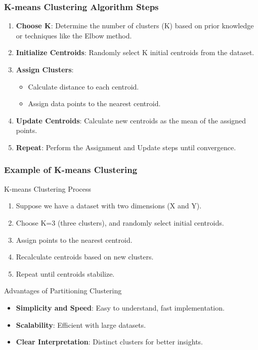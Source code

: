 \documentclass{beamer}
\begin{document}
\begin{frame}[fragile]
    \frametitle{K-means Clustering Algorithm Steps}
    \begin{enumerate}
        \item \textbf{Choose K}: Determine the number of clusters (K) based on prior knowledge or techniques like the Elbow method.
        \item \textbf{Initialize Centroids}: Randomly select K initial centroids from the dataset.
        \item \textbf{Assign Clusters}:
            \begin{itemize}
                \item Calculate distance to each centroid.
                \item Assign data points to the nearest centroid.
            \end{itemize}
        \item \textbf{Update Centroids}: Calculate new centroids as the mean of the assigned points.
        \item \textbf{Repeat}: Perform the Assignment and Update steps until convergence.
    \end{enumerate}
\end{frame}

\begin{frame}[fragile]
    \frametitle{Example of K-means Clustering}
    \begin{block}{K-means Clustering Process}
        \begin{enumerate}
            \item Suppose we have a dataset with two dimensions (X and Y).
            \item Choose K=3 (three clusters), and randomly select initial centroids.
            \item Assign points to the nearest centroid.
            \item Recalculate centroids based on new clusters.
            \item Repeat until centroids stabilize.
        \end{enumerate}
    \end{block}
    
    \begin{block}{Advantages of Partitioning Clustering}
        \begin{itemize}
            \item \textbf{Simplicity and Speed}: Easy to understand, fast implementation.
            \item \textbf{Scalability}: Efficient with large datasets.
            \item \textbf{Clear Interpretation}: Distinct clusters for better insights.
        \end{itemize}
    \end{block}
\end{frame}
\end{document}
